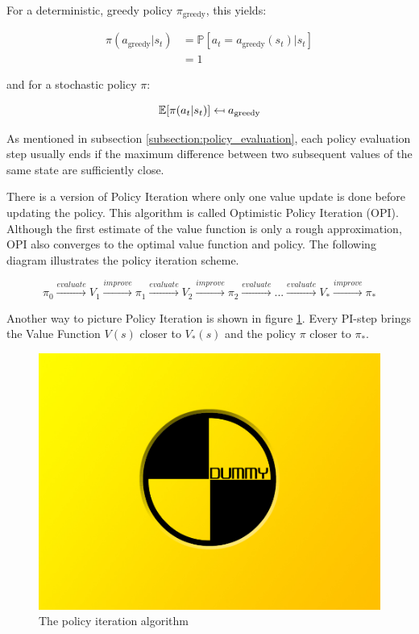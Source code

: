 For a deterministic, greedy policy $\pi_{\text{greedy}}$, this yields:

\begin{align}
\pi(a_{\text{greedy}}|s_t)&=\mathbb{P}[a_t=a_{\text{greedy}}(s_t)|s_t] \\ &=1
\end{align}

and for a stochastic policy $\pi$:

\begin{equation}
\mathbb{E}[\pi(a_t | s_t)] \mathrel{\reflectbox{\ensuremath{\mapsto}}} a_{\text{greedy}}
\end{equation}

As mentioned in subsection \ref{subsection:policy_evaluation}, each policy evaluation step usually ends if the maximum difference between two subsequent values of the same state are sufficiently close.

There is a version of Policy Iteration where only one value update is done before updating the policy. This algorithm is called Optimistic Policy Iteration (OPI). Although the first estimate of the value function is only a rough approximation, OPI also converges to the optimal value function and policy. The following diagram illustrates the policy iteration scheme.

\begin{equation*}
\pi_0 \overset{evaluate}{\longrightarrow} V_1 \overset{improve}{\longrightarrow} \pi_1 \overset{evaluate}{\longrightarrow} V_2 \overset{improve}{\longrightarrow} \pi_2 \overset{evaluate}{\longrightarrow} ... \overset{evaluate}{\longrightarrow} V_* \overset{improve}{\longrightarrow} \pi_*
\label{eq:pi_scheme}
\end{equation*}

Another way to picture Policy Iteration is shown in figure \ref{fig:PI_triangle}. Every PI-step brings the Value Function $V(s)$ closer to $V_*(s)$ and the policy $\pi$ closer to $\pi_*$.

\begin{figure}[h]
	\includegraphics[width=\textwidth]{src/pics/dummy.jpg}
	\caption{The policy iteration algorithm}
	\label{fig:PI_triangle} 
\end{figure}

